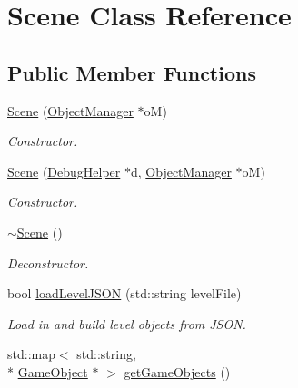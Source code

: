 \hypertarget{class_scene}{\section{Scene Class Reference}
\label{class_scene}
}
\subsection*{Public Member Functions}
\begin{DoxyCompactItemize}
\item 
\hypertarget{class_scene_a196045cf0bd3b0b915c627744e413a0b}{\hyperlink{class_scene_a196045cf0bd3b0b915c627744e413a0b}{Scene} (\hyperlink{class_object_manager}{Object\+Manager} $\ast$o\+M)}\label{class_scene_a196045cf0bd3b0b915c627744e413a0b}

\begin{DoxyCompactList}\small\item\em Constructor. \end{DoxyCompactList}\item 
\hypertarget{class_scene_adad88c7667e5d67bb28c4ec4bf3a22dc}{\hyperlink{class_scene_adad88c7667e5d67bb28c4ec4bf3a22dc}{Scene} (\hyperlink{class_debug_helper}{Debug\+Helper} $\ast$d, \hyperlink{class_object_manager}{Object\+Manager} $\ast$o\+M)}\label{class_scene_adad88c7667e5d67bb28c4ec4bf3a22dc}

\begin{DoxyCompactList}\small\item\em Constructor. \end{DoxyCompactList}\item 
\hypertarget{class_scene_a3b8cec2e32546713915f8c6303c951f1}{\hyperlink{class_scene_a3b8cec2e32546713915f8c6303c951f1}{$\sim$\+Scene} ()}\label{class_scene_a3b8cec2e32546713915f8c6303c951f1}

\begin{DoxyCompactList}\small\item\em Deconstructor. \end{DoxyCompactList}\item 
\hypertarget{class_scene_ad524a6e4cec067e9b1a59be767453cdd}{bool \hyperlink{class_scene_ad524a6e4cec067e9b1a59be767453cdd}{load\+Level\+J\+S\+O\+N} (std\+::string level\+File)}\label{class_scene_ad524a6e4cec067e9b1a59be767453cdd}

\begin{DoxyCompactList}\small\item\em Load in and build level objects from J\+S\+O\+N. \end{DoxyCompactList}\item 
\hypertarget{class_scene_aa5d4a784fe62d15fb083f8b73c3b4f94}{std\+::map$<$ std\+::string, \\*
\hyperlink{class_game_object}{Game\+Object} $\ast$ $>$ \hyperlink{class_scene_aa5d4a784fe62d15fb083f8b73c3b4f94}{get\+Game\+Objects} ()}\label{class_scene_aa5d4a784fe62d15fb083f8b73c3b4f94}


\end{DoxyCompactItemize}
